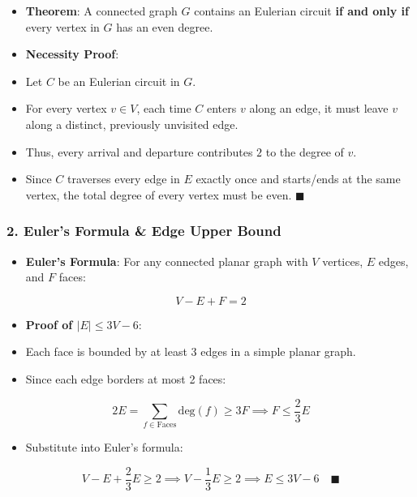 \documentclass[
]{book}
\providecommand{\tightlist}{%
  \setlength{\itemsep}{0pt}\setlength{\parskip}{0pt}}
\theoremstyle{definition}
\theoremstyle{definition}
\theoremstyle{definition}
\theoremstyle{definition}
\theoremstyle{remark}
\begin{document}
\begin{itemize}
\tightlist
\item
  \textbf{Theorem}: A connected graph \(G\) contains an Eulerian circuit \textbf{if and only if} every vertex in \(G\) has an even degree.
\item
  \textbf{Necessity Proof}:
\item
  Let \(C\) be an Eulerian circuit in \(G\).
\item
  For every vertex \(v \in V\), each time \(C\) enters \(v\) along an edge, it must leave \(v\) along a distinct, previously unvisited edge.
\item
  Thus, every arrival and departure contributes \(2\) to the degree of \(v\).
\item
  Since \(C\) traverses every edge in \(E\) exactly once and starts/ends at the same vertex, the total degree of every vertex must be even. \(\blacksquare\)
\end{itemize}

\subsubsection{2. Euler's Formula \& Edge Upper Bound}\label{eulers-formula-edge-upper-bound}

\begin{itemize}
\tightlist
\item
  \textbf{Euler's Formula}: For any connected planar graph with \(V\) vertices, \(E\) edges, and \(F\) faces:
\end{itemize}

\[V - E + F = 2\]

\begin{itemize}
\tightlist
\item
  \textbf{Proof of \(\vert{}E\vert{} \le 3V - 6\)}:
\item
  Each face is bounded by at least 3 edges in a simple planar graph.
\item
  Since each edge borders at most 2 faces:
\end{itemize}

\[2E = \sum_{f \in \text{Faces}} \text{deg}(f) \ge 3F \implies F \le \frac{2}{3}E\]

\begin{itemize}
\tightlist
\item
  Substitute into Euler's formula:
\end{itemize}

\[V - E + \frac{2}{3}E \ge 2 \implies V - \frac{1}{3}E \ge 2 \implies E \le 3V - 6 \quad \blacksquare\]
\end{document}
